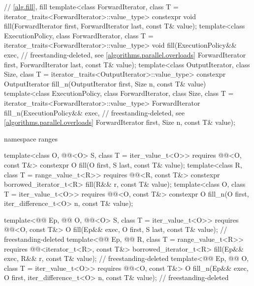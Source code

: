\begin{codeblock}
{  // \ref{alg.fill}, fill
  template<class ForwardIterator, class T = iterator_traits<ForwardIterator>::value_type>
    constexpr void fill(ForwardIterator first, ForwardIterator last, const T& value);
  template<class ExecutionPolicy, class ForwardIterator,
           class T = iterator_traits<ForwardIterator>::value_type>
    void fill(ExecutionPolicy&& exec,                           // freestanding-deleted, see \ref{algorithms.parallel.overloads}
              ForwardIterator first, ForwardIterator last, const T& value);
  template<class OutputIterator, class Size,
           class T = iterator_traits<OutputIterator>::value_type>
    constexpr OutputIterator fill_n(OutputIterator first, Size n, const T& value)
  template<class ExecutionPolicy, class ForwardIterator,
           class Size, class T = iterator_traits<ForwardIterator>::value_type>
    ForwardIterator fill_n(ExecutionPolicy&& exec,              // freestanding-deleted, see \ref{algorithms.parallel.overloads}
                           ForwardIterator first, Size n, const T& value);

  namespace ranges {
    template<class O, @@<O> S, class T = iter_value_t<O>>
      requires @@<O, const T&>
      constexpr O fill(O first, S last, const T& value);
    template<class R, class T = range_value_t<R>>
      requires @@<R, const T&>
      constexpr borrowed_iterator_t<R> fill(R&& r, const T& value);
    template<class O, class T = iter_value_t<O>>
      requires @@<O, const T&>
      constexpr O fill_n(O first, iter_difference_t<O> n, const T& value);

    template<@@ Ep, @@ O, @@<O> S,
             class T = iter_value_t<O>>
      requires @@<O, const T&>
      O fill(Ep&& exec, O first, S last, const T& value);                   // freestanding-deleted
    template<@@ Ep, @@ R, class T = range_value_t<R>>
      requires @@<iterator_t<R>, const T&>
      borrowed_iterator_t<R> fill(Ep&& exec, R&& r, const T& value);        // freestanding-deleted
    template<@@ Ep, @@ O, class T = iter_value_t<O>>
      requires @@<O, const T&>
      O fill_n(Ep&& exec, O first, iter_difference_t<O> n, const T& value); // freestanding-deleted
  }

}
\end{codeblock}
